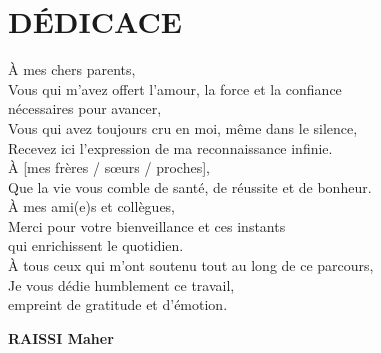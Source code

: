 \chapter*{D\'EDICACE}

\vspace{1cm}

\begin{flushright}
  \begin{minipage}{0.8\textwidth}
    \itshape\large\color{darkgray}

    \`A mes chers parents,\\[0.5em]
    Vous qui m'avez offert l'amour, la force et la confiance\\
    n\'ecessaires pour avancer,\\
    Vous qui avez toujours cru en moi, m\^eme dans le silence,\\
    Recevez ici l'expression de ma reconnaissance infinie.\\[1em]

    \`A [mes fr\`eres / s\oe urs / proches],\\[0.5em]
    Que la vie vous comble de sant\'e, de r\'eussite et de bonheur.\\[1em]

    \`A mes ami(e)s et coll\`egues,\\[0.5em]
    Merci pour votre bienveillance et ces instants\\
    qui enrichissent le quotidien.\\[1em]

    \`A tous ceux qui m'ont soutenu tout au long de ce parcours,\\[0.5em]
    Je vous d\'edie humblement ce travail,\\
    empreint de gratitude et d'\'emotion.

    \vspace{1cm}
    \begin{flushright}
      \normalfont\bfseries\color{primaryblue}
      RAISSI Maher
    \end{flushright}
  \end{minipage}
\end{flushright}
